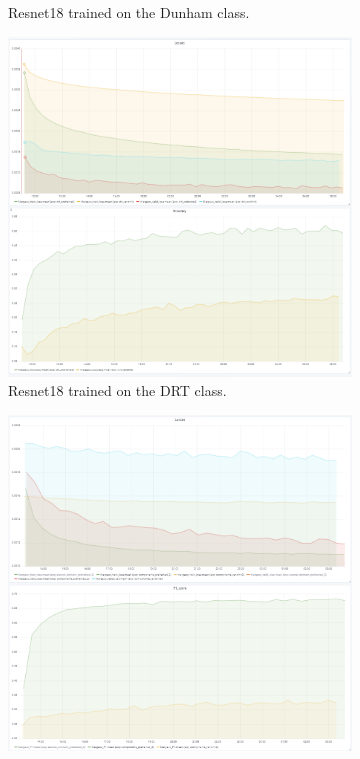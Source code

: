 \begin{figure}
\begin{subfigure}{.6\textwidth}
  \caption{Resnet18 trained on the Dunham class.}
  \label{fig:resinit_dunham}
\end{subfigure}
\begin{subfigure}{.6\textwidth}
  \centering
  \includegraphics[width=1\linewidth]{figures/04-Init_drt_acc.PNG}
  \caption{Resnet18 trained on the DRT class.}
  \label{fig:resinit_drt}
\end{subfigure}%
\begin{subfigure}{.6\textwidth}
  \centering
  \includegraphics[width=1\linewidth]{figures/04-Init_components_acc.PNG}

\end{subfigure}
\end{figure}
